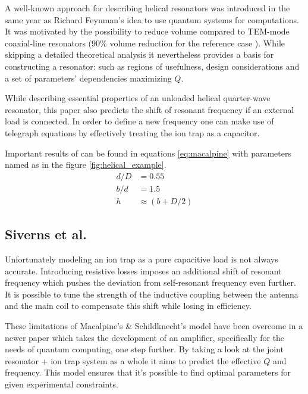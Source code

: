 A well-known approach \cite{Macalpine2000} for describing helical resonators was introduced in the same year as Richard Feynman's idea \cite{Feynman1960} to use quantum systems for computations. It was motivated by the possibility to reduce volume compared to TEM-mode coaxial-line resonators (90\% volume reduction for the reference case \cite{Macalpine2000}). While skipping a detailed theoretical analysis it nevertheless provides a basis for constructing a resonator: such as regions of usefulness, design considerations and a set of parameters' dependencies maximizing $Q$.

While describing essential properties of an unloaded helical quarter-wave resonator, this paper \cite{Macalpine2000} also predicts the shift of resonant frequency if an external load is connected. In order to define a new frequency one can make use of telegraph equations \cite{Rohde2009} by effectively treating the ion trap as a capacitor.

Important results of \cite{Macalpine2000} can be found in equations \ref{eq:macalpine} with parameters named as in the figure \ref{fig:helical_example}.
\begin{equation}
\begin{aligned}
	d/D &= 0.55\\
	b/d &= 1.5\\
	h &\approx (b + D/2)
\end{aligned}
\label{eq:macalpine}
\end{equation}
\subsection{Siverns et al.}
Unfortunately modeling an ion trap as a pure capacitive load is not always accurate. Introducing resistive losses imposes an additional shift of resonant frequency which pushes the deviation from self-resonant frequency even further. It is possible to tune the strength of the inductive coupling between the antenna and the main coil to compensate this shift while losing in efficiency.

These limitations of Macalpine's \& Schildknecht's \cite{Macalpine2000} model have been overcome in a newer paper \cite{Siverns2012} which takes the development of an amplifier, specifically for the needs of quantum computing, one step further. By taking a look at the joint resonator + ion trap system as a whole it aims to predict the effective $Q$ and frequency. This model ensures that it's possible to find optimal parameters for given experimental constraints.

